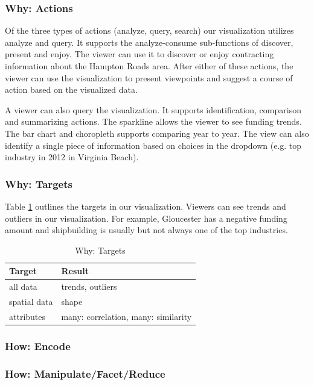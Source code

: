 \documentclass[10pt,journal,compsoc]{IEEEtran}
\begin{document}
\subsubsection{Why: Actions}

Of the three types of actions (analyze, query, search) our visualization utilizes analyze and query. It supports the analyze-consume sub-functions of discover, present and enjoy. The viewer can use it to discover or enjoy contracting information about the Hampton Roads area. After either of these actions, the viewer can use the visualization to present viewpoints and suggest a course of action based on the visualized data.

A viewer can also query the visualization. It supports identification, comparison and summarizing actions. The sparkline allows the viewer to see funding trends. The bar chart and choropleth supports comparing year to year. The view can also identify a single piece of information based on choices in the dropdown (e.g. top industry in 2012 in Virginia Beach).

\subsubsection{Why: Targets}

Table \ref{tab:why-targets} outlines the targets in our visualization. Viewers can see trends and outliers in our visualization. For example, Gloucester has a negative funding amount and shipbuilding is usually but not always one of the top industries.

\begin{table}[t]
\centering
\begin{tabular}{l | l}
\textbf{Target} & \textbf{Result} \\
\hline
all data & trends, outliers\\
\hline
spatial data & shape \\
\hline
attributes & many: correlation, many: similarity \\
\hline
\end{tabular}

\caption{Why: Targets}
\label{tab:why-targets}

\end{table} 

\subsubsection{How: Encode}

\subsubsection{How: Manipulate/Facet/Reduce}
\end{document}
